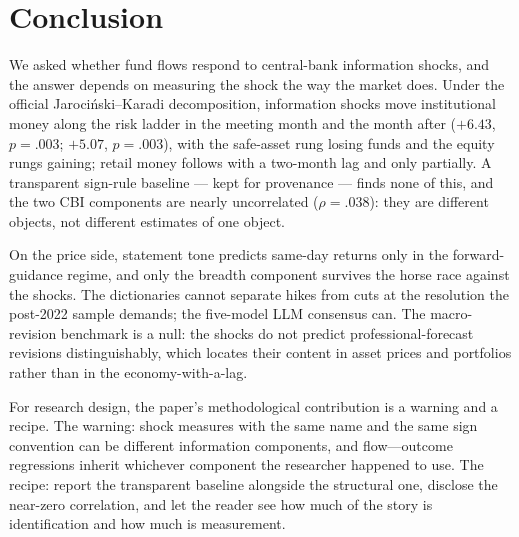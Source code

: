 \documentclass[11pt]{article}
\begin{document}
\section{Conclusion}\label{sec:conclusion}

We asked whether fund flows respond to central-bank information shocks, and
the answer depends on measuring the shock the way the market does. Under
the official Jaroci\'{n}ski--Karadi decomposition, information shocks move
institutional money along the risk ladder in the meeting month and the
month after ($+6.43$, $p=.003$; $+5.07$, $p=.003$), with the safe-asset rung
losing funds and the equity rungs gaining; retail money follows with a
two-month lag and only partially. A transparent sign-rule baseline --- kept
for provenance --- finds none of this, and the two CBI components are nearly
uncorrelated ($\rho = .038$): they are different objects, not different
estimates of one object.

On the price side, statement tone predicts same-day returns only in the
forward-guidance regime, and only the breadth component survives the horse
race against the shocks. The dictionaries cannot separate hikes from cuts
at the resolution the post-2022 sample demands; the five-model LLM
consensus can. The macro-revision benchmark is a null: the shocks do not
predict professional-forecast revisions distinguishably, which locates
their content in asset prices and portfolios rather than in the
economy-with-a-lag.

For research design, the paper's methodological contribution is a warning
and a recipe. The warning: shock measures with the same name and the same
sign convention can be different information components, and
flow---outcome regressions inherit whichever component the researcher
happened to use. The recipe: report the transparent baseline alongside the
structural one, disclose the near-zero correlation, and let the reader see
how much of the story is identification and how much is measurement.
\end{document}
